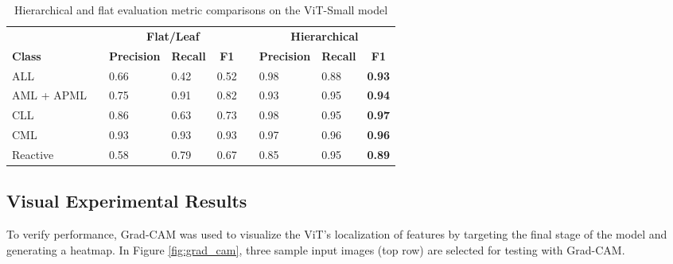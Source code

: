 \documentclass[runningheads]{llncs}
\begin{document}
\begin{table}[]
\centering

\caption{Hierarchical and flat evaluation metric comparisons on the ViT-Small model}
\label{tab:comparison}
\begin{tabular}{lllllclll}
\hline
           &  & \multicolumn{3}{c}{\textbf{Flat/Leaf}}                                                                         & \textbf{} & \multicolumn{3}{c}{\textbf{Hierarchical}}                                                                            \\ \cline{3-5} \cline{7-9} 
\textbf{Class}      &  & \multicolumn{1}{c}{\textbf{Precision}} & \multicolumn{1}{c}{\textbf{Recall}} & \multicolumn{1}{c}{\textbf{F1}} & \textbf{} & \multicolumn{1}{c}{\textbf{Precision}} & \multicolumn{1}{c}{\textbf{Recall}} & \multicolumn{1}{c}{\textbf{F1}} \\ \cline{1-1} \cline{3-5} \cline{7-9} 
ALL        &  & 0.66                                   & 0.42                                & 0.52                            &           & 0.98                                   & 0.88                                & \textbf{0.93}                   \\
AML + APML &  & 0.75                                   & 0.91                                & 0.82                            &           & 0.93                                   & 0.95                                & \textbf{0.94}                   \\
CLL        &  & 0.86                                   & 0.63                                & 0.73                            &           & 0.98                                   & 0.95                                & \textbf{0.97}                   \\
CML        &  & 0.93                                   & 0.93                                & 0.93                            &           & 0.97                                   & 0.96                                & \textbf{0.96}                   \\
Reactive   &  & 0.58                                   & 0.79                                & 0.67                            &           & 0.85                                   & 0.95                                & \textbf{0.89}                   \\ \hline
\end{tabular}
\end{table}

\subsection{Visual Experimental Results}
To verify performance, Grad-CAM was used to visualize the ViT's  localization of features by targeting the final stage of the model and generating a heatmap. In Figure \ref{fig:grad_cam}, three sample input images (top row) are selected for testing with Grad-CAM.
\end{document}
